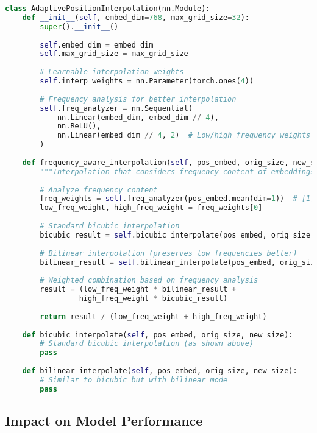 \begin{lstlisting}[language=Python, caption=Advanced position embedding interpolation]
class AdaptivePositionInterpolation(nn.Module):
    def __init__(self, embed_dim=768, max_grid_size=32):
        super().__init__()
        
        self.embed_dim = embed_dim
        self.max_grid_size = max_grid_size
        
        # Learnable interpolation weights
        self.interp_weights = nn.Parameter(torch.ones(4))
        
        # Frequency analysis for better interpolation
        self.freq_analyzer = nn.Sequential(
            nn.Linear(embed_dim, embed_dim // 4),
            nn.ReLU(),
            nn.Linear(embed_dim // 4, 2)  # Low/high frequency weights
        )
    
    def frequency_aware_interpolation(self, pos_embed, orig_size, new_size):
        """Interpolation that considers frequency content of embeddings"""
        
        # Analyze frequency content
        freq_weights = self.freq_analyzer(pos_embed.mean(dim=1))  # [1, 2]
        low_freq_weight, high_freq_weight = freq_weights[0]
        
        # Standard bicubic interpolation
        bicubic_result = self.bicubic_interpolate(pos_embed, orig_size, new_size)
        
        # Bilinear interpolation (preserves low frequencies better)
        bilinear_result = self.bilinear_interpolate(pos_embed, orig_size, new_size)
        
        # Weighted combination based on frequency analysis
        result = (low_freq_weight * bilinear_result + 
                 high_freq_weight * bicubic_result)
        
        return result / (low_freq_weight + high_freq_weight)
    
    def bicubic_interpolate(self, pos_embed, orig_size, new_size):
        # Standard bicubic interpolation (as shown above)
        pass
    
    def bilinear_interpolate(self, pos_embed, orig_size, new_size):
        # Similar to bicubic but with bilinear mode
        pass
\end{lstlisting}

\subsection{Impact on Model Performance}

